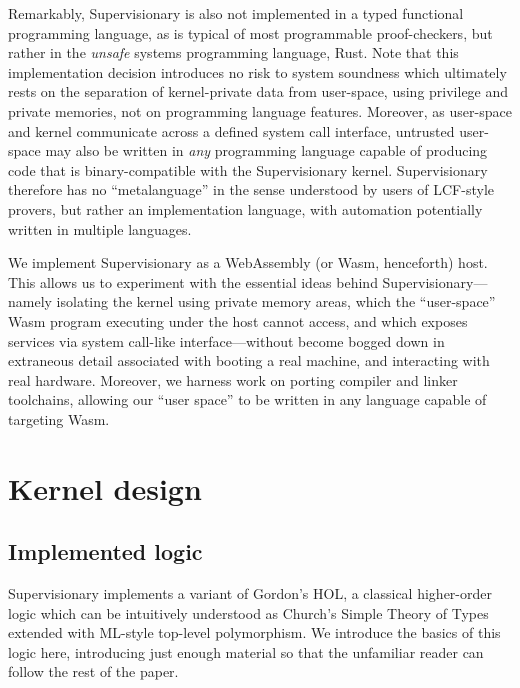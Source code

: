 \documentclass[a4paper, UKenglish, cleveref, autoref, thm-restate]{lipics-v2021}
\begin{document}
Remarkably, Supervisionary is also not implemented in a typed functional programming language, as is typical of most programmable proof-checkers, but rather in the \emph{unsafe} systems programming language, Rust.
Note that this implementation decision introduces no risk to system soundness which ultimately rests on the separation of kernel-private data from user-space, using privilege and private memories, not on programming language features.
Moreover, as user-space and kernel communicate across a defined system call interface, untrusted user-space may also be written in \emph{any} programming language capable of producing code that is binary-compatible with the Supervisionary kernel.
Supervisionary therefore has no ``metalanguage'' in the sense understood by users of LCF-style provers, but rather an implementation language, with automation potentially written in multiple languages.

We implement Supervisionary as a WebAssembly (or Wasm, henceforth) host.
This allows us to experiment with the essential ideas behind Supervisionary---namely isolating the kernel using private memory areas, which the ``user-space'' Wasm program executing under the host cannot access, and which exposes services via system call-like interface---without become bogged down in extraneous detail associated with booting a real machine, and interacting with real hardware.
Moreover, we harness work on porting compiler and linker toolchains, allowing our ``user space'' to be written in any language capable of targeting Wasm.

\section{Kernel design}
\label{sect.kernel.design}

\subsection{Implemented logic}

Supervisionary implements a variant of Gordon's HOL, a classical higher-order logic which can be intuitively understood as Church's Simple Theory of Types extended with ML-style top-level polymorphism.
We introduce the basics of this logic here, introducing just enough material so that the unfamiliar reader can follow the rest of the paper.
\end{document}
